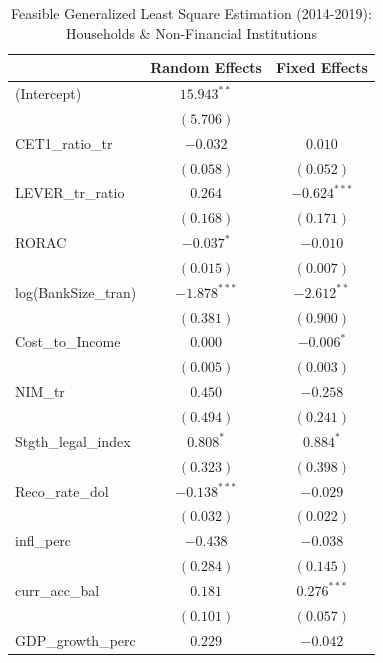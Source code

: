 
\begin{table}
\caption{Feasible Generalized Least Square Estimation (2014-2019): Households & Non-Financial Institutions}
\begin{center}
\begin{tabular}{l c c}
\hline
 & Random Effects & Fixed Effects \\
\hline
(Intercept)         & $15.943^{**}$  &                \\
                    & $(5.706)$      &                \\
CET1\_ratio\_tr     & $-0.032$       & $0.010$        \\
                    & $(0.058)$      & $(0.052)$      \\
LEVER\_tr\_ratio    & $0.264$        & $-0.624^{***}$ \\
                    & $(0.168)$      & $(0.171)$      \\
RORAC               & $-0.037^{*}$   & $-0.010$       \\
                    & $(0.015)$      & $(0.007)$      \\
log(BankSize\_tran) & $-1.878^{***}$ & $-2.612^{**}$  \\
                    & $(0.381)$      & $(0.900)$      \\
Cost\_to\_Income    & $0.000$        & $-0.006^{*}$   \\
                    & $(0.005)$      & $(0.003)$      \\
NIM\_tr             & $0.450$        & $-0.258$       \\
                    & $(0.494)$      & $(0.241)$      \\
Stgth\_legal\_index & $0.808^{*}$    & $0.884^{*}$    \\
                    & $(0.323)$      & $(0.398)$      \\
Reco\_rate\_dol     & $-0.138^{***}$ & $-0.029$       \\
                    & $(0.032)$      & $(0.022)$      \\
infl\_perc          & $-0.438$       & $-0.038$       \\
                    & $(0.284)$      & $(0.145)$      \\
curr\_acc\_bal      & $0.181$        & $0.276^{***}$  \\
                    & $(0.101)$      & $(0.057)$      \\
GDP\_growth\_perc   & $0.229$        & $-0.042$       \\

\end{tabular}
\end{center}
\end{table}
